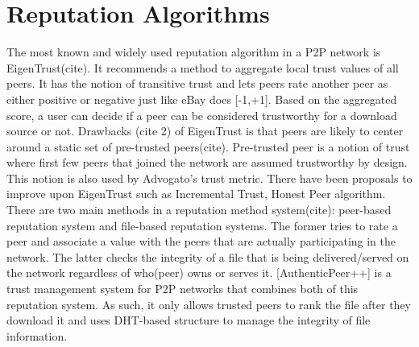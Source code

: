 %


\section{Reputation Algorithms}
The most known and widely used reputation algorithm in a P2P network is
EigenTrust(cite). It recommends a method to aggregate local trust values of all
peers. It has the notion of transitive trust and lets peers rate another peer
as either positive or negative just like eBay does [-1,+1]. Based on the
aggregated score, a user can decide if a peer can be considered trustworthy for
a download source or not. Drawbacks (cite 2) of EigenTrust is that peers are
likely to center around a static set of pre-trusted peers(cite). Pre-trusted
peer is a notion of trust where first few peers that joined the network are
assumed trustworthy by design. This notion is also used by Advogato's trust
metric. There have been proposals to improve upon EigenTrust such as
Incremental Trust, Honest Peer algorithm.  There are two main methods in a
reputation method system(cite): peer-based reputation system and file-based
reputation systems. The former tries to rate a peer and associate a value with
the peers that are actually participating in the network. The latter checks the
integrity of a file that is being delivered/served on the network regardless of
who(peer) owns or serves it. [AuthenticPeer++] is a trust management system for
P2P networks that combines both of this reputation system. As such, it only
allows trusted peers to rank the file after they download it and uses DHT-based
structure to manage the integrity of file information. 


